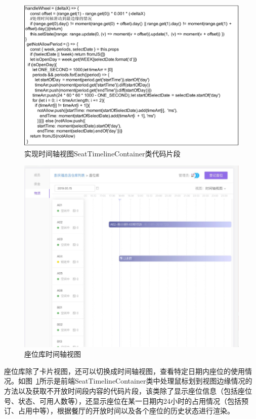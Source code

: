 \begin{figure}[htbp!]
    \centering
    \includegraphics[width=5in]{FIGs/chapter4/11.pdf}
    \caption{实现时间轴视图SeatTimelineContainer类代码片段}\label{fig_seat_11}
\end{figure}

\begin{figure}[htbp!]
    \centering
    \includegraphics[width=5in]{FIGs/chapter4/seat_time_view.pdf}
    \caption{座位库时间轴视图}\label{fig_seat_time_view}
\end{figure}

座位库除了卡片视图，还可以切换成时间轴视图，查看特定日期内座位的使用情况。如图~\ref{fig_seat_11}所示是前端SeatTimelineContainer类中处理鼠标划到视图边缘情况的方法以及获取不开放时间段内容的代码片段，该类除了显示座位信息（包括座位号、状态、可用人数等），还显示座位在某一日期内24小时的占用情况（包括预订、占用中等），根据餐厅的开放时间以及各个座位的历史状态进行渲染。

